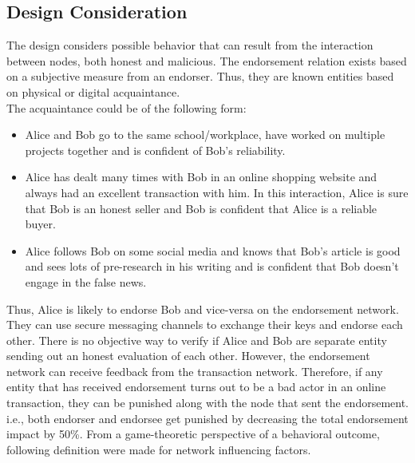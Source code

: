 %

\subsection{Design Consideration} \label{subsec:design_considerations}
The design considers possible behavior that can result from the interaction
between nodes, both honest and malicious. The endorsement relation exists based
on a subjective measure from an endorser. Thus, they are known entities based
on physical or digital acquaintance.\\

The acquaintance could be of the following form:
\begin{itemize}
	\item Alice and Bob go to the same school/workplace, have worked on
		multiple projects together and is confident of Bob's reliability.
	\item Alice has dealt many times with Bob in an online shopping website and
		always had an excellent transaction with him. In this interaction,
		Alice is sure that Bob is an honest seller and Bob is confident that
		Alice is a reliable buyer. 
	\item Alice follows Bob on some social media and knows that Bob's
		article is good and sees lots of pre-research in his writing and is
		confident that Bob doesn't engage in the false news.
\end{itemize}
Thus, Alice is likely to endorse Bob and vice-versa on the endorsement network.
They can use secure messaging channels to exchange their keys and endorse each
other. There is no objective way to verify if Alice and Bob are separate entity
sending out an honest evaluation of each other. However, the endorsement
network can receive feedback from the transaction network. Therefore, if any
entity that has received endorsement turns out to be a bad actor in an online
transaction, they can be punished along with the node that sent the
endorsement. i.e., both endorser and endorsee get punished by decreasing the
total endorsement impact by 50\%.
From a game-theoretic perspective of a behavioral outcome, following
definition were made for network influencing factors. 


